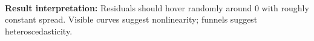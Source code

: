 \documentclass[11pt]{article}
\begin{document}
    \begin{center}
    \end{center}
    { \hspace*{\fill} \\}
    
    \textbf{Result interpretation:} Residuals should hover randomly around 0
with roughly constant spread. Visible curves suggest nonlinearity;
funnels suggest heteroscedasticity.


    
    
    
\end{document}
